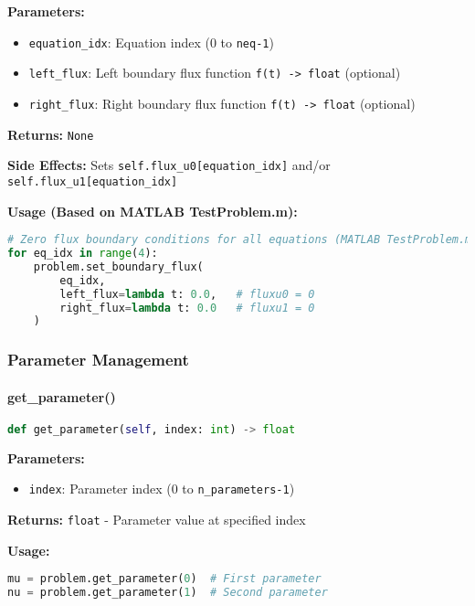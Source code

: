 \textbf{Parameters:}
\begin{itemize}
    \item \texttt{equation\_idx}: Equation index (0 to \texttt{neq-1})
    \item \texttt{left\_flux}: Left boundary flux function \texttt{f(t) -> float} (optional)
    \item \texttt{right\_flux}: Right boundary flux function \texttt{f(t) -> float} (optional)
\end{itemize}

\textbf{Returns:} \texttt{None}

\textbf{Side Effects:} Sets \texttt{self.flux\_u0[equation\_idx]} and/or \texttt{self.flux\_u1[equation\_idx]}

\textbf{Usage (Based on MATLAB TestProblem.m):}
\begin{lstlisting}[language=Python, caption=Boundary Flux Usage]
# Zero flux boundary conditions for all equations (MATLAB TestProblem.m)
for eq_idx in range(4):
    problem.set_boundary_flux(
        eq_idx,
        left_flux=lambda t: 0.0,   # fluxu0 = 0
        right_flux=lambda t: 0.0   # fluxu1 = 0
    )
\end{lstlisting}

\subsubsection{Parameter Management}

\paragraph{get\_parameter()}
\begin{lstlisting}[language=Python, caption=Get Parameter Method]
def get_parameter(self, index: int) -> float
\end{lstlisting}

\textbf{Parameters:}
\begin{itemize}
    \item \texttt{index}: Parameter index (0 to \texttt{n\_parameters-1})
\end{itemize}

\textbf{Returns:} \texttt{float} - Parameter value at specified index

\textbf{Usage:}
\begin{lstlisting}[language=Python, caption=Get Parameter Usage]
mu = problem.get_parameter(0)  # First parameter
nu = problem.get_parameter(1)  # Second parameter
\end{lstlisting}

